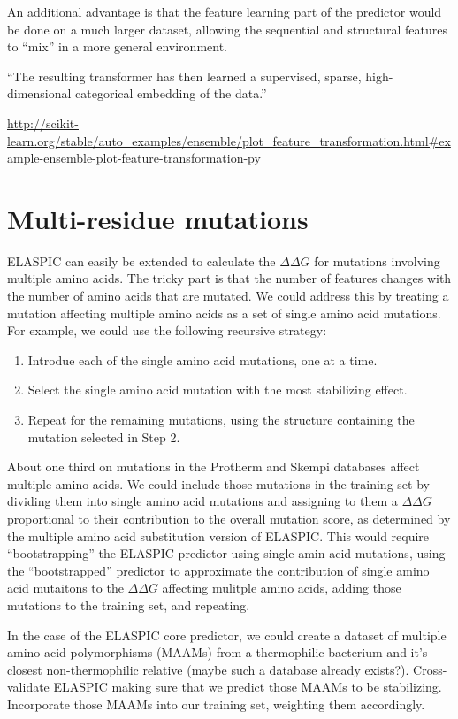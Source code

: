 An additional advantage is that the feature learning part of the predictor would be done on a much larger dataset, allowing the sequential and structural features to ``mix'' in a more general environment.

``The resulting transformer has then learned a supervised, sparse, high-dimensional categorical embedding of the data.''

\url{http://scikit-learn.org/stable/auto_examples/ensemble/plot_feature_transformation.html#example-ensemble-plot-feature-transformation-py}



\section{Multi-residue mutations}

ELASPIC can easily be extended to calculate the $\Delta \Delta G$ for mutations involving multiple amino acids. The tricky part is that the number of features changes with the number of amino acids that are mutated. We could address this by treating a mutation affecting multiple amino acids as a set of single amino acid mutations. For example, we could use the following recursive strategy:

\begin{enumerate}
    \item Introdue each of the single amino acid mutations, one at a time.
    \item Select the single amino acid mutation with the most stabilizing effect.
    \item Repeat for the remaining mutations, using the structure containing the mutation selected in Step 2.
\end{enumerate}

About one third on mutations in the Protherm and Skempi databases affect multiple amino acids. We could include those mutations in the training set by dividing them into single amino acid mutations and assigning to them a $\Delta \Delta G$ proportional to their contribution to the overall mutation score, as determined by the multiple amino acid substitution version of ELASPIC. This would require ``bootstrapping'' the ELASPIC predictor using single amin acid mutations, using the ``bootstrapped'' predictor to approximate the contribution of single amino acid mutaitons to the $\Delta \Delta G$ affecting mulitple amino acids, adding those mutations to the training set, and repeating.

In the case of the ELASPIC core predictor, we could create a dataset of multiple amino acid polymorphisms (MAAMs) from a thermophilic bacterium and it's closest non-thermophilic relative (maybe such a database already exists?). Cross-validate ELASPIC making sure that we predict those MAAMs to be stabilizing. Incorporate those MAAMs into our training set, weighting them accordingly.

